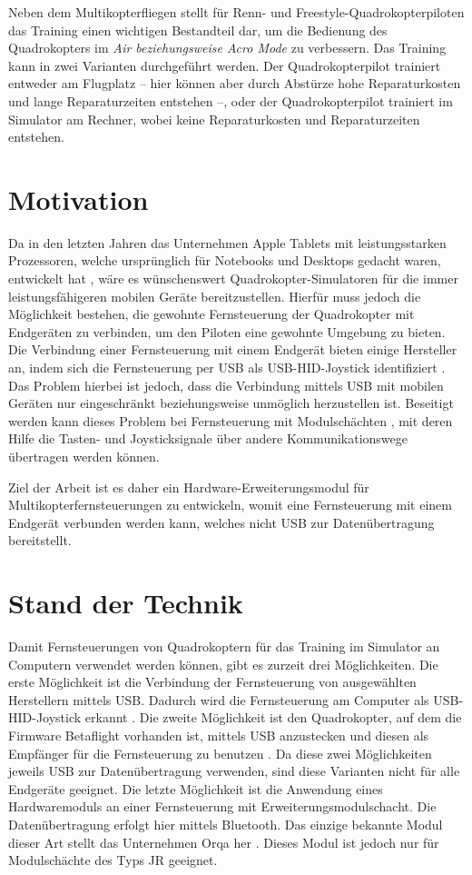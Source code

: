 Neben dem Multikopterfliegen stellt für Renn- und Freestyle-Quadrokopterpiloten das Training einen wichtigen Bestandteil dar, um die Bedienung des Quadrokopters im \textit{Air beziehungsweise Acro Mode} zu verbessern. Das Training kann in zwei Varianten durchgeführt werden. Der Quadrokopterpilot trainiert entweder am Flugplatz -- hier können aber durch Abstürze hohe Reparaturkosten und lange Reparaturzeiten entstehen --, oder der Quadrokopterpilot trainiert im Simulator am Rechner, wobei keine Reparaturkosten und Reparaturzeiten entstehen.

\section{Motivation}

Da in den letzten Jahren das Unternehmen Apple Tablets mit leistungsstarken Prozessoren, welche ursprünglich für Notebooks und Desktops gedacht waren, entwickelt hat \cite{appleM2IPad}, wäre es wünschenswert Quadrokopter-Simulatoren für die immer leistungsfähigeren mobilen Geräte bereitzustellen. Hierfür muss jedoch die Möglichkeit bestehen, die gewohnte Fernsteuerung der Quadrokopter mit Endgeräten zu verbinden, um den Piloten eine gewohnte Umgebung zu bieten. Die Verbindung einer Fernsteuerung mit einem Endgerät bieten einige Hersteller an, indem sich die Fernsteuerung per USB als USB-\acs{HID}-Joystick identifiziert \cite{opentxJoystick}. Das Problem hierbei ist jedoch, dass die Verbindung mittels USB mit mobilen Geräten nur eingeschränkt beziehungsweise unmöglich herzustellen ist. Beseitigt werden kann dieses Problem bei Fernsteuerung mit Modulschächten \cite{opentxModulbay}, mit deren Hilfe  die Tasten- und Joysticksignale über andere Kommunikationswege übertragen werden können.

Ziel der Arbeit ist es daher ein Hardware-Erweiterungsmodul für Multikopterfernsteuerungen zu entwickeln, womit eine Fernsteuerung mit einem Endgerät verbunden werden kann, welches nicht USB zur Datenübertragung bereitstellt.

\section{Stand der Technik}

Damit Fernsteuerungen von Quadrokoptern für das Training im Simulator an Computern verwendet werden können, gibt es zurzeit drei Möglichkeiten. Die erste Möglichkeit ist die Verbindung der Fernsteuerung von ausgewählten Herstellern mittels USB. Dadurch wird die Fernsteuerung am Computer als USB-\acs{HID}-Joystick erkannt \cite{opentxJoystick}. Die zweite Möglichkeit ist den Quadrokopter, auf dem die Firmware Betaflight vorhanden ist, mittels USB anzustecken und diesen als Empfänger für die Fernsteuerung zu benutzen \cite{betaflightHID}. Da diese zwei Möglichkeiten jeweils USB zur Datenübertragung verwenden, sind diese Varianten nicht für alle Endgeräte geeignet. Die letzte Möglichkeit ist die Anwendung eines Hardwaremoduls an einer Fernsteuerung mit Erweiterungsmodulschacht. Die Datenübertragung erfolgt hier mittels Bluetooth. Das einzige bekannte Modul dieser Art stellt das Unternehmen Orqa her \cite{orqaBluetoothModule}. Dieses Modul ist jedoch nur für Modulschächte des Typs JR geeignet.